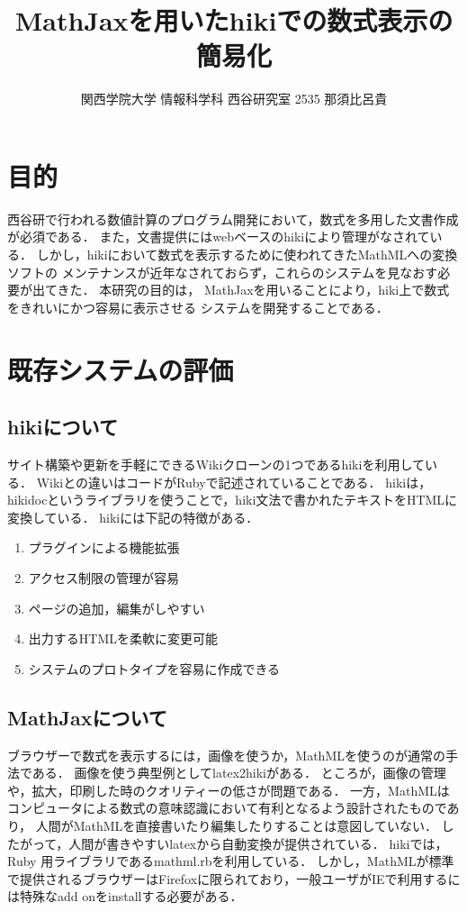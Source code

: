 \documentclass[10pt,a4j,twocolumn]{jsarticle}
\begin{document}
\title{MathJaxを用いたhikiでの数式表示の簡易化}
\author{関西学院大学 情報科学科 西谷研究室 2535 那須比呂貴}
\date{}
\maketitle
\section{目的}
西谷研で行われる数値計算のプログラム開発において，数式を多用した文書作成が必須である．
また，文書提供にはwebベースのhikiにより管理がなされている．
しかし，hikiにおいて数式を表示するために使われてきたMathMLへの変換ソフトの
メンテナンスが近年なされておらず，これらのシステムを見なおす必要が出てきた．
本研究の目的は，
MathJaxを用いることにより，hiki上で数式をきれいにかつ容易に表示させる
システムを開発することである．

\section{既存システムの評価}
\subsection{hikiについて}
サイト構築や更新を手軽にできるWikiクローンの1つであるhikiを利用している．
Wikiとの違いはコードがRubyで記述されていることである．
hikiは，hikidocというライブラリを使うことで，hiki文法で書かれたテキストをHTMLに変換している．
hikiには下記の特徴がある．
\begin{enumerate}
\item プラグインによる機能拡張
\item アクセス制限の管理が容易
\item ページの追加，編集がしやすい
\item 出力するHTMLを柔軟に変更可能
\item システムのプロトタイプを容易に作成できる
\end{enumerate}
\subsection{MathJaxについて}
ブラウザーで数式を表示するには，画像を使うか，MathMLを使うのが通常の手法である．
画像を使う典型例としてlatex2hikiがある．
ところが，画像の管理や，拡大，印刷した時のクオリティーの低さが問題である．
一方，MathMLはコンピュータによる数式の意味認識において有利となるよう設計されたものであり，
人間がMathMLを直接書いたり編集したりすることは意図していない．
したがって，人間が書きやすいlatexから自動変換が提供されている．
hikiでは，Ruby 用ライブラリであるmathml.rbを利用している\cite{1}．
しかし，MathMLが標準で提供されるブラウザーはFirefoxに限られており，一般ユーザがIEで利用するには特殊なadd onをinstallする必要がある．
\end{document}
